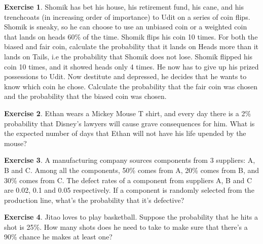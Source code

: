 \documentclass[12pt]{amsart}
\theoremstyle{definition}
\newtheorem{exercise}{Exercise}
\numberwithin{equation}{section}
\theoremstyle{plain}
\begin{document}
\begin{exercise}

    Shomik has bet his house, his retirement fund, his cane, and his trenchcoats (in increasing order of importance) to Udit on a series of coin flips. Shomik is sneaky, so he can choose to use an unbiased coin or a weighted coin that lands on heads 60$\%$ of the time. Shomik flips his coin 10 times. For both the biased and fair coin, calculate the probability that it lands on Heads more than it lands on Tails, i.e the probability that Shomik does not lose. 
    \newline
    Shomik flipped his coin 10 times, and it showed heads only 4 times. He now has to give up his prized possessions to Udit. Now destitute and depressed, he decides that he wants to know which coin he chose. Calculate the probability that the fair coin was chosen and the probability that the biased coin was chosen.
    
\end{exercise}


\begin{exercise}
    Ethan wears a Mickey Mouse T shirt, and every day there is a 2\% probability that Disney's lawyers will cause grave consequences for him. What is the expected number of days that Ethan will not have his life upended by the mouse?
\end{exercise}



\begin{exercise}
    A manufacturing company sources components from 3 suppliers: A, B and C. Among all the components, 50\% comes from A, 20\% comes from B, and 30\% comes from C. The defect rates of a component from suppliers A, B and C are 0.02, 0.1 and 0.05 respectively. If a component is randomly selected from the production line, what’s the probability that it’s defective? %
\end{exercise}
    
\begin{exercise}
    Jitao loves to play basketball. Suppose the probability that he hits a shot is 25\%. How many shots does he need to take to make sure that there’s a 90\% chance he makes at least one? %
\end{exercise}
\end{document}
